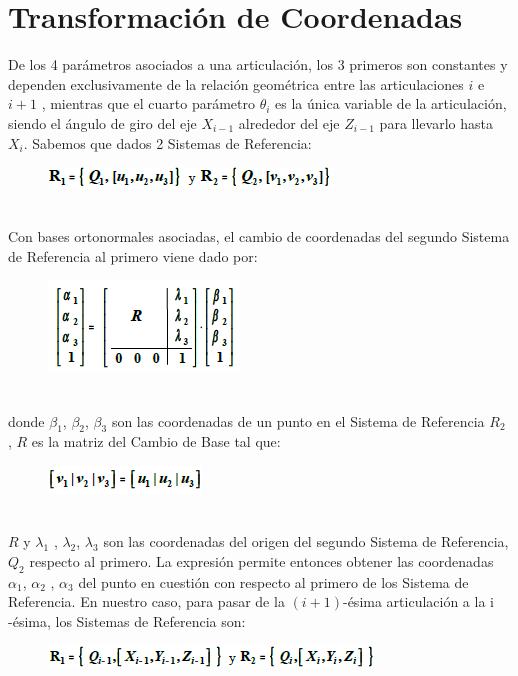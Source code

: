 \documentclass[11pt,a4paper,oldfontcommands,oneside]{memoir}
\begin{document}
\chapter{Transformación de Coordenadas}
De los 4 parámetros asociados a una articulación, los 3 primeros son constantes y dependen exclusivamente de la relación geométrica entre las articulaciones $i$ e $i+1$ , mientras que el cuarto parámetro $\theta_i$ es la única variable de la articulación, siendo el ángulo de giro del eje $X_{i-1}$ alrededor del eje $Z_{i-1}$ para llevarlo hasta $X_i$.
Sabemos que dados 2 Sistemas de Referencia:
\begin{figure}[h]
	\includegraphics[scale=1]{4.png}
	\label{4}
\end{figure}\\
Con bases ortonormales asociadas, el cambio de coordenadas del segundo Sistema de Referencia al primero viene dado por:
\begin{figure}[h]
	\includegraphics[scale=2]{5.png}
	\label{5}
\end{figure}\\
donde $\beta_1$, $\beta_2$, $\beta_3$ son las coordenadas de un punto en el Sistema de Referencia  $R_2$ , $R$ es la matriz del Cambio de Base tal que:
\begin{figure}[h]
	\includegraphics[scale=1.35]{6.png}
	\label{6}
\end{figure}\\
$R$ y $\lambda_1$ , $\lambda_2$, $\lambda_3$ son las coordenadas del origen del segundo Sistema de Referencia, $Q_2$ respecto al primero. La expresión permite entonces obtener las coordenadas $\alpha_1$, $\alpha_2$ , $\alpha_3$ del punto en cuestión con respecto al primero de los Sistema de Referencia.
En nuestro caso, para pasar de la $(i+1)$-ésima articulación a la i -ésima, los Sistemas de Referencia son:
\begin{figure}[h]
	\includegraphics[scale=1.5]{7.png}
	\label{7}
\end{figure}\\
\vspace{2cm}
\hfill
\end{document}
